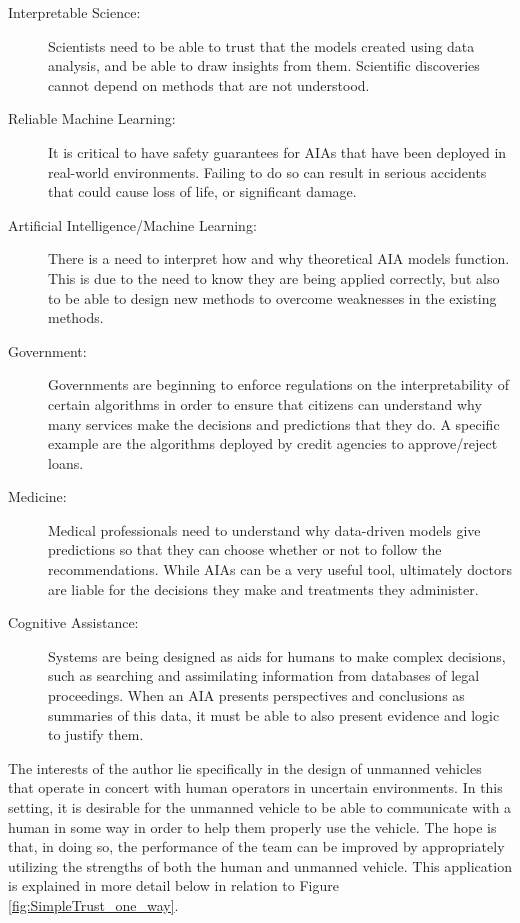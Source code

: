     \begin{description}
        \item [Interpretable Science:] Scientists need to be able to trust that the models created using data analysis, and be able to draw insights from them. Scientific discoveries cannot depend on methods that are not understood.
        \item [Reliable Machine Learning:] It is critical to have safety guarantees for AIAs that have been deployed in real-world environments. Failing to do so can result in serious accidents that could cause loss of life, or significant damage.
        \item [Artificial Intelligence/Machine Learning:] There is a need to interpret how and why theoretical AIA models function. This is due to the need to know they are being applied correctly, but also to be able to design new methods to overcome weaknesses in the existing methods.
        \item [Government:] Governments are beginning to enforce regulations on the interpretability of certain algorithms in order to ensure that citizens can understand why many services make the decisions and predictions that they do. A specific example are the algorithms deployed by credit agencies to approve/reject loans.
        \item [Medicine:] Medical professionals need to understand why data-driven models give predictions so that they can choose whether or not to follow the recommendations. While AIAs can be a very useful tool, ultimately doctors are liable for the decisions they make and treatments they administer.
        \item [Cognitive Assistance:] Systems are being designed as aids for humans to make complex decisions, such as searching and assimilating information from databases of legal proceedings. When an AIA presents perspectives and conclusions as summaries of this data, it must be able to also present evidence and logic to justify them.
    \end{description}

    The interests of the author lie specifically in the design of unmanned vehicles that operate in concert with human operators in uncertain environments. In this setting, it is desirable for the unmanned vehicle to be able to communicate with a human in some way in order to help them properly use the vehicle. The hope is that, in doing so, the performance of the team can be improved by appropriately utilizing the strengths of both the human and unmanned vehicle. This application is explained in more detail below in relation to Figure \ref{fig:SimpleTrust_one_way}.

